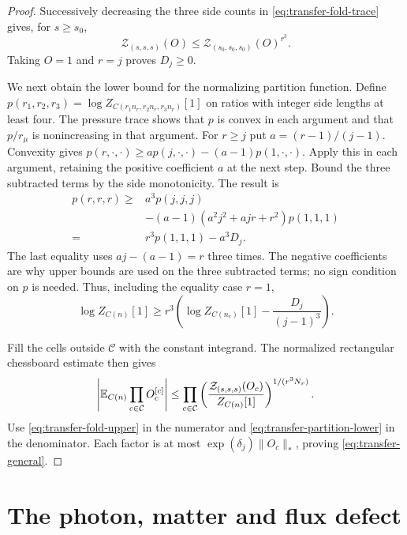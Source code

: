 \begin{proof}
Successively decreasing the three side counts in
\eqref{eq:transfer-fold-trace} gives, for $s\ge s_0$,
\begin{equation}\label{eq:transfer-fold-upper}
 \mathcal Z_{(s,s,s)}(O)
            \le\mathcal Z_{(s_0,s_0,s_0)}(O)^{r^3}.
\end{equation}
Taking $O=1$ and $r=j$ proves $D_j\ge0$.

We next obtain the lower bound for the normalizing partition
function. Define
$p(r_1,r_2,r_3)=\log Z_{C(r_1n_r,r_2n_r,r_3n_r)}[1]$
on ratios with integer side lengths at least four.
The pressure trace \cite[(75)]{ChamberLattice} shows that
$p$ is convex in each argument and that $p/r_\mu$ is
nonincreasing in that argument. For $r\ge j$ put
$a=(r-1)/(j-1)$. Convexity gives
$p(r,\cdot,\cdot)\ge a p(j,\cdot,\cdot)
-(a-1)p(1,\cdot,\cdot)$.
Apply this in each argument, retaining the positive coefficient
$a$ at the next step. Bound the three subtracted terms by the
side monotonicity. The result is
\begin{align*}
 p(r,r,r)\ge{}&
 a^3p(j,j,j)\\
 &-(a-1)(a^2j^2+ajr+r^2)p(1,1,1)\\
 ={}&r^3p(1,1,1)-a^3D_j.
\end{align*}
The last equality uses $aj-(a-1)=r$ three times.
The negative coefficients are why upper bounds are used on
the three subtracted terms; no sign condition on $p$ is needed.
Thus, including the equality case $r=1$,
\begin{equation}\label{eq:transfer-partition-lower}
 \log Z_{C(n)}[1]\ge
 r^3\left(\log Z_{C(n_r)}[1]-\frac{D_j}{(j-1)^3}\right).
\end{equation}

Fill the cells outside $\mathcal C$ with the constant integrand.
The normalized rectangular chessboard estimate then gives
\[
 \left|\mathbb E_{C(n)}\prod_{c\in\mathcal C}O_c^{[c]}\right|
 \le\prod_{c\in\mathcal C}
       \left(\frac{\mathcal Z_{(s,s,s)}(O_c)}
                         {Z_{C(n)}[1]}\right)^{1/(r^3N_r)}.
\]
Use \eqref{eq:transfer-fold-upper} in the numerator and
\eqref{eq:transfer-partition-lower} in the denominator.
Each factor is at most $\exp(\delta_j)\|O_c\|_*$, proving
\eqref{eq:transfer-general}.
\end{proof}

\section{The photon, matter and flux defect}\label{sec:vtm-defect}


